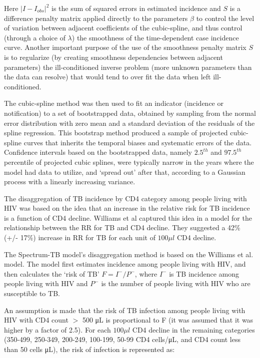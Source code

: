Here $|I - I_{obs}|^2$  is the sum of squared errors in estimated incidence and $S$ is a difference penalty matrix applied directly to the parameters $\beta$ to control the level of variation between adjacent coefficients of the cubic-spline, and thus control (through a choice of $\lambda$) the smoothness of the time-dependent case incidence curve. Another important purpose of the use of the smoothness penalty matrix $S$ is to regularize (by creating smoothness dependencies between adjacent parameters) the ill-conditioned inverse problem (more unknown parameters than the data can resolve) that would tend to over fit the data when left ill-conditioned.

The cubic-spline method was then used to fit an indicator (incidence or notification) to a set of bootstrapped data, obtained by sampling from the normal error distribution with zero mean and a standard deviation of the residuals of the spline regression. This bootstrap method produced a sample of projected cubic-spline curves that inherits the temporal biases and systematic errors of the data. Confidence intervals based on the bootstrapped data, namely $2.5^{th}$ and $97.5^{th}$ percentile of projected cubic splines, were typically narrow in the years where the model had data to utilize, and ‘spread out’ after that, according to a Gaussian process with a linearly increasing variance.

The disaggregation of TB incidence by CD4 category among people living with HIV was based on the idea that an increase in the relative risk for TB incidence is a function of CD4 decline. Williams et al captured this idea in a model for the relationship between the RR for TB and CD4 decline.\cite{20974976} They suggested a 42\% (+/- 17\%) increase in RR for TB for each unit of $100\mu l$ CD4 decline.

The Spectrum-TB model’s disaggregation method is based on the Williams et al. model. The model first estimates incidence among people living with HIV, and then calculates the ‘risk of TB’ $F=I^- / P^-$, where $I^-$ is TB incidence among people living with HIV and $P^-$ is the number of people living with HIV who are susceptible to TB.

An assumption is made that the risk of TB infection among people living with HIV with CD4 count $>$ 500 μL is proportional to F (it was assumed that it was higher by a factor of 2.5).\cite{15609223} For each $100\mu l$ CD4 decline in the remaining categories (350-499, 250-349, 200-249, 100-199, 50-99 CD4 cells/μL, and CD4 count less than 50 cells μL), the risk of infection is represented as:

